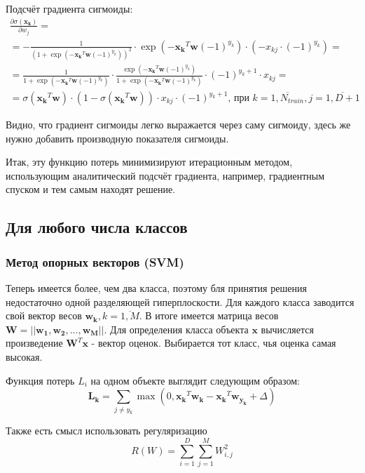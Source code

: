 \documentclass[a4paper]{article}
\newcommand{\w}{\bm{w}}
\newcommand{\wk}{\bm{w_k}}
\newcommand{\yk}{y_k}
\newcommand{\xk}{\bm{x_k}}
\newcommand{\xkj}{x_{kj}}
\newcommand{\W}{\bm{W}}
\begin{document}
Подсчёт градиента сигмоиды: 
\begin{multline*}
\frac{\partial \sigma(\xk)}{\partial w_j} = \\ = - \frac{1}{(1 + \exp(-\xk^T\w(-1)^{\yk}))^2} \cdot \exp(-\xk^T\w(-1)^{\yk}) \cdot (-\xkj\cdot(-1)^{\yk})=  \\ =
\frac{1}{1 + \exp(-\xk^T\w(-1)^{\yk})} \cdot \frac{\exp(-\xk^T\w(-1)^{\yk})}{1 + \exp(-\xk^T\w(-1)^{\yk})} \cdot (-1)^{\yk + 1} \cdot \xkj = \\ =
\sigma(\xk^T\w) \cdot (1 - \sigma(\xk^T\w)) \cdot \xkj \cdot (-1)^{\yk + 1} \text{, при } k = \overline{1, N_{train}}, j = \overline{1, D + 1}
\end{multline*}

Видно, что градиент сигмоиды легко выражается через саму сигмоиду, здесь же нужно добавить производную показателя сигмоиды.

Итак, эту функцию потерь минимизируют итерационным методом, использующим аналитический подсчёт градиента, например, градиентным спуском и тем самым находят решение.

\subsection{Для любого числа классов}

\subsubsection{Метод опорных векторов (SVM)}

Теперь имеется более, чем два класса, поэтому бля принятия решения недостаточно одной разделяющей гиперплоскости. Для каждого класса заводится свой вектор весов $\wk, k = \overline{1, M}$. В итоге имеется матрица весов $\W = ||\bm{w_1}, \bm{w_2}, ..., \bm{w_M}||$. Для определения класса объекта $\bm{x}$ вычисляется произведение $\W^T\bm{x}$ - вектор оценок. Выбирается тот класс, чья оценка самая высокая.

Функция потерь $L_i$ на одном объекте выглядит следующим образом:
\begin{equation}
\bm{L_k} = \sum_{j \neq y_k}\max{(0, \xk^T\wk - \xk^T\bm{w_{y_k}} + \Delta)}
\end{equation}

Также есть смысл использовать регуляризацию 
\begin{equation}
R(W) = \sum_{i = 1}^{D}\sum_{j = 1}^M W_{i,j}^2
\end{equation}
\end{document}
